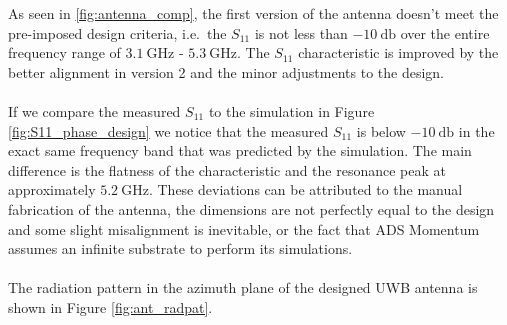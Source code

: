 \documentclass[a4paper]{article}        %
\begin{document}
		As seen in \autoref{fig:antenna_comp}, the first version of the antenna doesn't meet the pre-imposed design criteria, i.e.\ the $S_{11}$ is not less than $\SI{-10}{\decibel}$ over the entire frequency range of $\SI{3.1}{\giga\hertz}$ - $\SI{5.3}{\giga\hertz}$.
		The $S_{11}$ characteristic is improved by the better alignment in version 2 and the minor adjustments to the design.\\\\
		If we compare the measured $S_{11}$ to the simulation in Figure \ref{fig:S11_phase_design} we notice that the measured $S_{11}$ is below $\SI{-10}{\decibel}$ in the exact same frequency band that was predicted by the simulation. The main difference is the flatness of the characteristic and the resonance peak at approximately $\SI{5.2}{\giga\hertz}$. These deviations can be attributed to the manual fabrication of the antenna, the dimensions are not perfectly equal to the design and some slight misalignment is inevitable, or the fact that ADS Momentum assumes an infinite substrate to perform its simulations.\\\\
		The radiation pattern in the azimuth plane of the designed UWB antenna is shown in Figure \ref{fig:ant_radpat}. 
\end{document}
